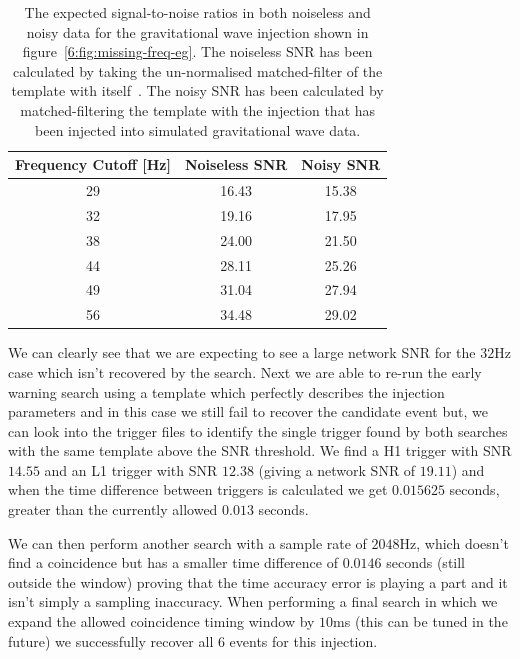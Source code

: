 %
\begin{table}[ht]
    \centering
    \setlength{\tabcolsep}{4pt}
    \begin{tabular}{ccc}
        \toprule
        \textbf{Frequency Cutoff [Hz]} & \textbf{Noiseless SNR} & \textbf{Noisy SNR} \\
        \midrule
        29 & 16.43 & 15.38 \\
        32 & 19.16 & 17.95 \\
        38 & 24.00 & 21.50 \\
        44 & 28.11 & 25.26 \\
        49 & 31.04 & 27.94 \\
        56 & 34.48 & 29.02 \\
        \bottomrule
    \end{tabular}
    \caption{The expected signal-to-noise ratios in both noiseless and noisy data for the gravitational wave injection shown in figure~\ref{6:fig:missing-freq-eg}. The noiseless SNR has been calculated by taking the un-normalised matched-filter of the template with itself~\cite{Brown_Thesis:2004}. The noisy SNR has been calculated by matched-filtering the template with the injection that has been injected into simulated gravitational wave data.}
    \label{6:tab:noise_snrs}
\end{table}
%
We can clearly see that we are expecting to see a large network SNR for the $32$Hz case which isn't recovered by the search. Next we are able to re-run the early warning search using a template which perfectly describes the injection parameters and in this case we still fail to recover the candidate event but, we can look into the trigger files to identify the single trigger found by both searches with the same template above the SNR threshold. We find a H1 trigger with SNR $14.55$ and an L1 trigger with SNR $12.38$ (giving a network SNR of $19.11$) and when the time difference between triggers is calculated we get $0.015625$ seconds, greater than the currently allowed $0.013$ seconds. 

We can then perform another search with a sample rate of $2048$Hz, which doesn't find a coincidence but has a smaller time difference of $0.0146$ seconds (still outside the window) proving that the time accuracy error is playing a part and it isn't simply a sampling inaccuracy. When performing a final search in which we expand the allowed coincidence timing window by $10$ms (this can be tuned in the future) we successfully recover all $6$ events for this injection.

